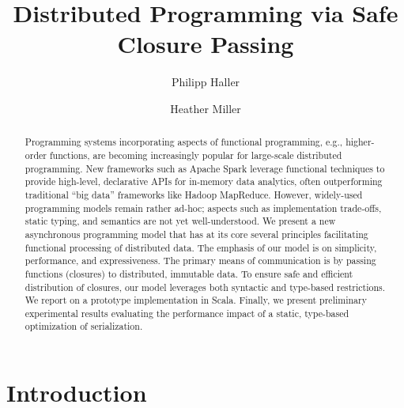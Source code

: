 \documentclass[submission,copyright,creativecommons]{eptcs}
\title{Distributed Programming via Safe Closure Passing}
\author{Philipp Haller
\institute{KTH Royal Institute of Technology\\ Stockholm, Sweden}
\email{phaller@kth.se}
\and
Heather Miller
\institute{EPFL\\
Lausanne, Switzerland}
\email{heather.miller@epfl.ch}
}
\begin{document}
\maketitle

\begin{abstract}
Programming systems incorporating aspects of functional programming, e.g.,
higher-order functions, are becoming increasingly popular for large-scale
distributed programming. New frameworks such as Apache Spark leverage
functional techniques to provide high-level, declarative APIs for in-memory
data analytics, often outperforming traditional ``big data'' frameworks like
Hadoop MapReduce. However, widely-used programming models remain rather
ad-hoc; aspects such as implementation trade-offs, static typing, and semantics
are not yet well-understood. We present a new asynchronous programming model
that has at its core several principles facilitating functional processing of
distributed data. The emphasis of our model is on simplicity, performance,
and expressiveness. The primary means of
communication is by passing functions (closures) to distributed, immutable
data. To ensure safe and efficient distribution of closures, our model
leverages both syntactic and type-based restrictions. We report on a prototype
implementation in Scala. Finally, we present preliminary experimental results
evaluating the performance impact of a static, type-based optimization of serialization.
\end{abstract}

\section{Introduction}

\nocite{*}


\end{document}

